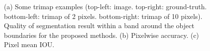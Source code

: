 \begin{figure}
\centering
{}
  \caption{(a) Some trimap examples (top-left: image. top-right: ground-truth. bottom-left: trimap of 2 pixels. bottom-right: trimap of 10 pixels). Quality of segmentation result within a band around the object boundaries for the proposed methods. (b) Pixelwise accuracy. (c) Pixel mean IOU. 
    }  
  \label{fig:IOUBoundary}
\end{figure}


